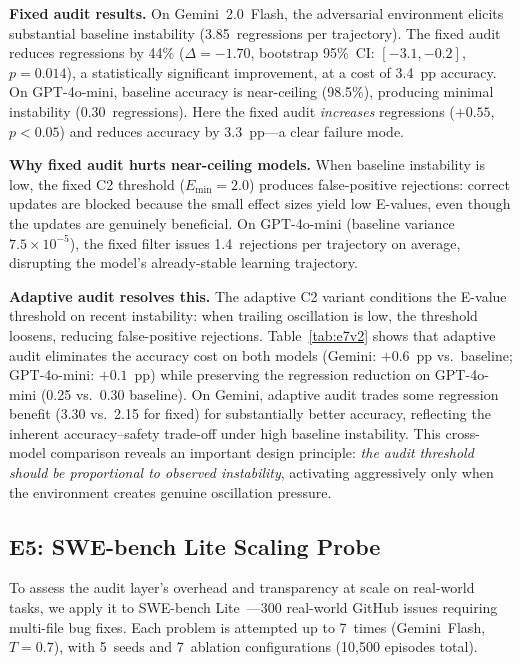 \documentclass{article}
\begin{document}
\textbf{Fixed audit results.}
On Gemini~2.0~Flash, the adversarial environment elicits substantial
baseline instability (3.85~regressions per trajectory). The fixed
audit reduces regressions by 44\%
($\Delta{=}{-}1.70$, bootstrap 95\%~CI: $[-3.1, -0.2]$, $p{=}0.014$),
a statistically significant improvement, at a cost of 3.4~pp accuracy.
On GPT-4o-mini, baseline accuracy is near-ceiling (98.5\%), producing
minimal instability (0.30~regressions). Here the fixed audit
\emph{increases} regressions ($+0.55$, $p{<}0.05$) and reduces
accuracy by 3.3~pp---a clear failure mode.

\textbf{Why fixed audit hurts near-ceiling models.}
When baseline instability is low, the fixed C2 threshold
($E_{\min}{=}2.0$) produces false-positive rejections: correct
updates are blocked because the small effect sizes yield low
E-values, even though the updates are genuinely beneficial.
On GPT-4o-mini (baseline variance $7.5{\times}10^{-5}$), the
fixed filter issues 1.4~rejections per trajectory on average,
disrupting the model's already-stable learning trajectory.

\textbf{Adaptive audit resolves this.}
The adaptive C2 variant conditions the E-value threshold on recent
instability: when trailing oscillation is low, the threshold loosens,
reducing false-positive rejections. Table~\ref{tab:e7v2} shows
that adaptive audit eliminates the accuracy cost on both models
(Gemini: $+0.6$~pp vs.\ baseline; GPT-4o-mini: $+0.1$~pp)
while preserving the regression reduction on GPT-4o-mini
(0.25 vs.\ 0.30 baseline).
On Gemini, adaptive audit trades some regression benefit
(3.30 vs.\ 2.15 for fixed) for substantially better accuracy,
reflecting the inherent accuracy--safety trade-off under high
baseline instability.
This cross-model comparison reveals an important design principle:
\emph{the audit threshold should be proportional to observed
instability}, activating aggressively only when the environment
creates genuine oscillation pressure.


\subsection{E5: SWE-bench Lite Scaling Probe}
\label{sec:e5}

To assess the audit layer's overhead and transparency at scale on
real-world tasks, we apply it to SWE-bench
Lite~\cite{jimenez2024swebench}---300 real-world GitHub issues
requiring multi-file bug fixes.
Each problem is attempted up to 7~times (Gemini~Flash, $T{=}0.7$),
with 5~seeds and 7~ablation configurations (10{,}500 episodes total).
\end{document}

